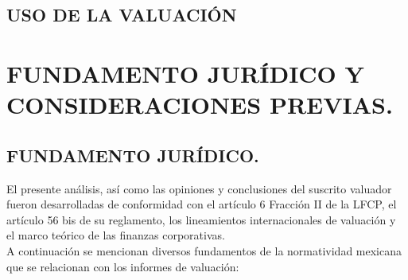 \section{USO DE LA VALUACI\'ON}\label{sec:i}


\espacio{4cm}

\chapter{FUNDAMENTO JUR\'IDICO Y CONSIDERACIONES PREVIAS.}\label{cap:3}
\thispagestyle{fancy}
\setcounter{section}{9}

\section*{FUNDAMENTO JUR\'IDICO.}\label{sec:juridico}
El presente an\'alisis, as\'i como las opiniones y conclusiones del suscrito valuador fueron desarrolladas de conformidad con el art\'iculo 6 Fracci\'on II de la LFCP, el art\'iculo 56 bis de su reglamento, los lineamientos internacionales de valuaci\'on y el marco te\'orico de las finanzas corporativas.\\

A continuaci\'on se mencionan diversos fundamentos de la normatividad mexicana que se relacionan con los informes de valuaci\'on:\\
